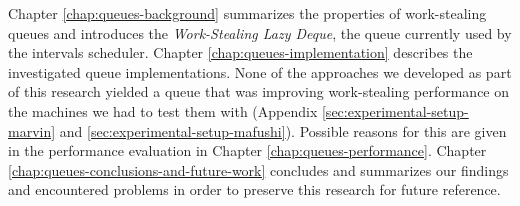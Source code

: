 Chapter \ref{chap:queues-background} summarizes the properties of
work-stealing queues and introduces the \emph{Work-Stealing Lazy
  Deque}, the queue currently used by the intervals scheduler. Chapter
\ref{chap:queues-implementation} describes the investigated queue
implementations. None of the approaches we developed as part of this
research yielded a queue that was improving work-stealing performance
on the machines we had to test them with (Appendix
\ref{sec:experimental-setup-marvin} and
\ref{sec:experimental-setup-mafushi}). Possible reasons for this are
given in the performance evaluation in Chapter
\ref{chap:queues-performance}. Chapter
\ref{chap:queues-conclusions-and-future-work} concludes and summarizes
our findings and encountered problems in order to preserve this
research for future reference.



